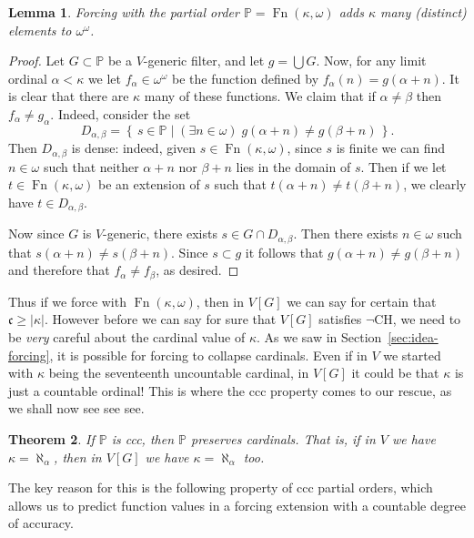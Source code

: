 \documentclass[11pt,oneside,a4paper]{amsbook}
\newcommand{\set}[1]{\left\{\,#1\,\right\}}
\newcommand{\PP}{\mathbb P}
\DeclareMathOperator{\Fn}{Fn}
\theoremstyle{definition}
\theoremstyle{plain}
\newtheorem{theorem}{Theorem}[section]
\newtheorem{lemma}[theorem]{Lemma}
\theoremstyle{definition}
\theoremstyle{remark}
\numberwithin{equation}{section}
\numberwithin{figure}{section}
\begin{document}
\begin{lemma}
  Forcing with the partial order $\PP=\Fn(\kappa,\omega)$ adds $\kappa$ many (distinct) elements to $\omega^\omega$.
\end{lemma}

\begin{proof}
  Let $G\subset\PP$ be a $V$-generic filter, and let $g=\bigcup G$. Now, for any limit ordinal $\alpha<\kappa$ we let $f_\alpha\in\omega^\omega$ be the function defined by $f_\alpha(n)=g(\alpha+n)$. It is clear that there are $\kappa$ many of these functions. We claim that if $\alpha\neq\beta$ then $f_\alpha\neq g_\alpha$. Indeed, consider the set
  \[D_{\alpha,\beta}=\set{s\in\PP\mid (\exists n\in\omega)\;g(\alpha+n)\neq g(\beta+n)}\text{.}
  \]
  Then $D_{\alpha,\beta}$ is dense: indeed, given $s\in\Fn(\kappa,\omega)$, since $s$ is finite we can find $n\in\omega$ such that neither $\alpha+n$ nor $\beta+n$ lies in the domain of $s$. Then if we let $t\in\Fn(\kappa,\omega)$ be an extension of $s$ such that $t(\alpha+n)\neq t(\beta+n)$, we clearly have $t\in D_{\alpha,\beta}$.

  Now since $G$ is $V$-generic, there exists $s\in G\cap D_{\alpha,\beta}$. Then there exists $n\in\omega$ such that $s(\alpha+n)\neq s(\beta+n)$. Since $s\subset g$ it follows that $g(\alpha+n)\neq g(\beta+n)$ and therefore that $f_\alpha\neq f_\beta$, as desired.
\end{proof}

Thus if we force with $\Fn(\kappa,\omega)$, then in $V[G]$ we can say for certain that $\mathfrak c\geq|\kappa|$. However before we can say for sure that $V[G]$ satisfies $\neg$CH, we need to be \emph{very} careful about the cardinal value of $\kappa$. As we saw in Section~\ref{sec:idea-forcing}, it is possible for forcing to collapse cardinals. Even if in $V$ we started with $\kappa$ being the seventeenth uncountable cardinal, in $V[G]$ it could be that $\kappa$ is just a countable ordinal! This is where the ccc property comes to our rescue, as we shall now see see see.

\begin{theorem}
  \label{thm:ccc-preserve}
  If $\PP$ is ccc, then $\PP$ preserves cardinals. That is, if in $V$ we have $\kappa=\aleph_\alpha$, then in $V[G]$ we have $\kappa=\aleph_\alpha$ too.
\end{theorem}

The key reason for this is the following property of ccc partial orders, which allows us to predict function values in a forcing extension with a countable degree of accuracy.
\end{document}
